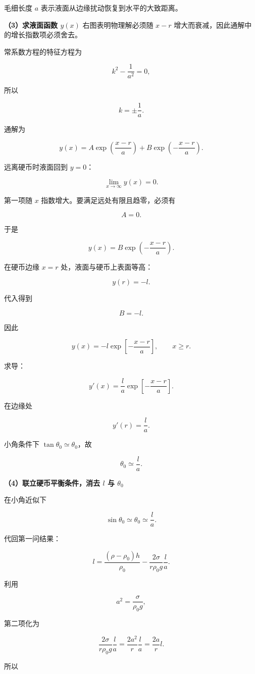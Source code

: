 \documentclass[12pt,a4paper,UTF8]{ctexart}
\begin{document}
毛细长度 \(a\) 表示液面从边缘扰动恢复到水平的大致距离。

\textbf{（3）求液面函数 \(y(x)\)} 右图表明物理解必须随 \(x-r\)
增大而衰减，因此通解中的增长指数项必须舍去。

常系数方程的特征方程为

\[k^2-\frac1{a^2}=0,\]

所以

\[k=\pm\frac1a.\]

通解为

\[
y(x)=A\exp\left(\frac{x-r}{a}\right)
+B\exp\left(-\frac{x-r}{a}\right).
\]

远离硬币时液面回到 \(y=0\)：

\[\lim_{x\to\infty}y(x)=0.\]

第一项随 \(x\) 指数增大。要满足远处有限且趋零，必须有

\[A=0.\]

于是

\[y(x)=B\exp\left(-\frac{x-r}{a}\right).\]

在硬币边缘 \(x=r\) 处，液面与硬币上表面等高：

\[y(r)=-l.\]

代入得到

\[B=-l.\]

因此

\[
\boxed{
y(x)=-l\exp\left[-\frac{x-r}{a}\right]
},
\qquad x\ge r.
\]

求导：

\[
y'(x)=\frac{l}{a}
\exp\left[-\frac{x-r}{a}\right].
\]

在边缘处

\[y'(r)=\frac la.\]

小角条件下 \(\tan\theta_0\simeq\theta_0\)，故

\[
\boxed{\theta_0\simeq\frac la}.
\]

\textbf{（4）联立硬币平衡条件，消去 \(l\) 与 \(\theta_0\)}

在小角近似下

\[\sin\theta_0\simeq\theta_0\simeq\frac la.\]

代回第一问结果：

\[
l=\frac{(\rho-\rho_0)h}{\rho_0}
-\frac{2\sigma}{r\rho_0g}\frac la.
\]

利用

\[a^2=\frac{\sigma}{\rho_0g},\]

第二项化为

\[
\frac{2\sigma}{r\rho_0g}\frac la
=\frac{2a^2}{r}\frac la
=\frac{2a}{r}l.
\]

所以
\end{document}

